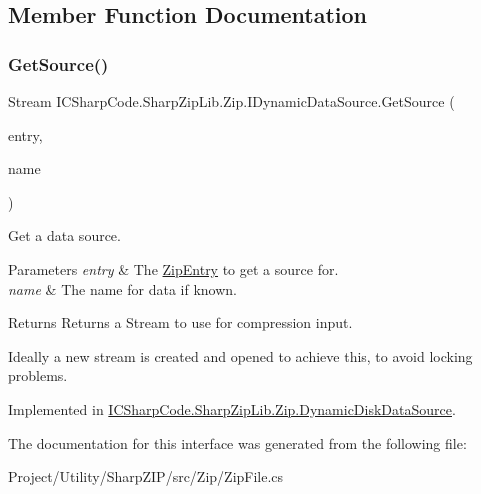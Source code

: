 \subsection{Member Function Documentation}
\mbox{\label{interface_i_c_sharp_code_1_1_sharp_zip_lib_1_1_zip_1_1_i_dynamic_data_source_a33808af75b8f68dc18b7fcd55a5f951f}} 
\subsubsection{\texorpdfstring{Get\+Source()}{GetSource()}}
{\footnotesize\ttfamily Stream I\+C\+Sharp\+Code.\+Sharp\+Zip\+Lib.\+Zip.\+I\+Dynamic\+Data\+Source.\+Get\+Source (\begin{DoxyParamCaption}\item[{\hyperlink{class_i_c_sharp_code_1_1_sharp_zip_lib_1_1_zip_1_1_zip_entry}{Zip\+Entry}}]{entry,  }\item[{string}]{name }\end{DoxyParamCaption})}



Get a data source. 


\begin{DoxyParams}{Parameters}
{\em entry} & The \hyperlink{class_i_c_sharp_code_1_1_sharp_zip_lib_1_1_zip_1_1_zip_entry}{Zip\+Entry} to get a source for.\\
\hline
{\em name} & The name for data if known.\\
\hline
\end{DoxyParams}
\begin{DoxyReturn}{Returns}
Returns a Stream to use for compression input.
\end{DoxyReturn}


Ideally a new stream is created and opened to achieve this, to avoid locking problems.

Implemented in \hyperlink{class_i_c_sharp_code_1_1_sharp_zip_lib_1_1_zip_1_1_dynamic_disk_data_source_a565488e7729b6a2fe3fd03fad5a9c03e}{I\+C\+Sharp\+Code.\+Sharp\+Zip\+Lib.\+Zip.\+Dynamic\+Disk\+Data\+Source}.



The documentation for this interface was generated from the following file\+:\begin{DoxyCompactItemize}
\item 
Project/\+Utility/\+Sharp\+Z\+I\+P/src/\+Zip/Zip\+File.\+cs\end{DoxyCompactItemize}
